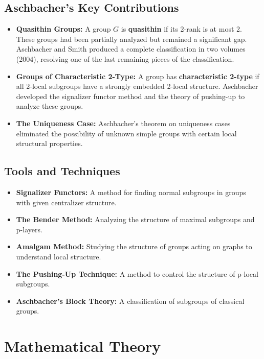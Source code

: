 \subsection{Aschbacher's Key Contributions}

\begin{itemize}
    \item \textbf{Quasithin Groups:} A group $G$ is \textbf{quasithin} if its 2-rank is at most 2. These groups had been partially analyzed but remained a significant gap. Aschbacher and Smith produced a complete classification in two volumes (2004), resolving one of the last remaining pieces of the classification.
    \item \textbf{Groups of Characteristic 2-Type:} A group has \textbf{characteristic 2-type} if all 2-local subgroups have a strongly embedded 2-local structure. Aschbacher developed the signalizer functor method and the theory of pushing-up to analyze these groups.
    \item \textbf{The Uniqueness Case:} Aschbacher's theorem on uniqueness cases eliminated the possibility of unknown simple groups with certain local structural properties.
\end{itemize}

\subsection{Tools and Techniques}

\begin{itemize}
    \item \textbf{Signalizer Functors:} A method for finding normal subgroups in groups with given centralizer structure.
    \item \textbf{The Bender Method:} Analyzing the structure of maximal subgroups and p-layers.
    \item \textbf{Amalgam Method:} Studying the structure of groups acting on graphs to understand local structure.
    \item \textbf{The Pushing-Up Technique:} A method to control the structure of p-local subgroups.
    \item \textbf{Aschbacher's Block Theory:} A classification of subgroups of classical groups.
\end{itemize}

\section{Mathematical Theory}

